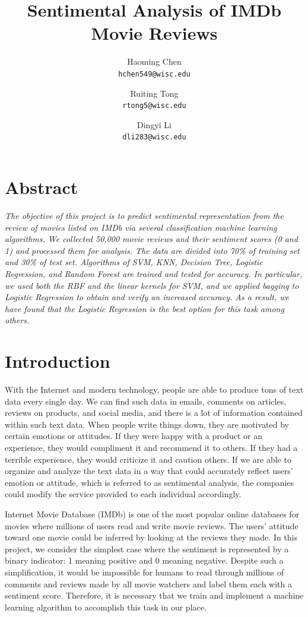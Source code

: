 \documentclass[10pt,twocolumn,letterpage]{article}
\begin{document}
	\title{\textbf{Sentimental Analysis of IMDb Movie Reviews}}
	\author{Haoming Chen\\
		{\tt\small hchen549@wisc.edu}
		\and
		Ruiting Tong\\
		{\tt\small rtong5@wisc.edu}
		\and
		Dingyi Li\\
		{\tt\small dli283@wisc.edu}
	}
	\date{}
	\maketitle
	
	\section*{Abstract} 
	\textit{The objective of this project is to predict sentimental representation from the review of movies listed on IMDb via several classification machine learning algorithms. We collected 50,000 movie reviews and their sentiment scores (0 and 1) and processed them for analysis. The data are divided into 70\% of training set and 30\% of test set. Algorithms of SVM, KNN, Decision Tree, Logistic Regression, and Random Forest are trained and tested for accuracy. In particular, we used both the RBF and the linear kernels for SVM, and we applied bagging to Logistic Regression to obtain and verify an increased accuracy. As a result, we have found that the Logistic Regression is the best option for this task among others.} 			
	
	\section{Introduction} 
	With the Internet and modern technology, people are able to produce tons of text data every single day. We can find such data in emails, comments on articles, reviews on products, and social media, and there is a lot of information contained within such text data. When people write things down, they are motivated by certain emotions or attitudes. If they were happy with a product or an experience, they would compliment it and recommend it to others. If they had a terrible experience, they would criticize it and caution others. If we are able to organize and analyze the text data in a way that could accurately reflect users’ emotion or attitude, which is referred to as sentimental analysis, the companies could modify the service provided to each individual accordingly.
	
	Internet Movie Database (IMDb) is one of the most popular online databases for movies where millions of users read and write movie reviews. The users’ attitude toward one movie could be inferred by looking at the reviews they made. In this project, we consider the simplest case where the sentiment is represented by a binary indicator: 1 meaning positive and 0 meaning negative. Despite such a simplification, it would be impossible for humans to read through millions of comments and reviews made by all movie watchers and label them each with a sentiment score. Therefore, it is necessary that we train and implement a machine learning algorithm to accomplish this task in our place. 
	
\end{document}
